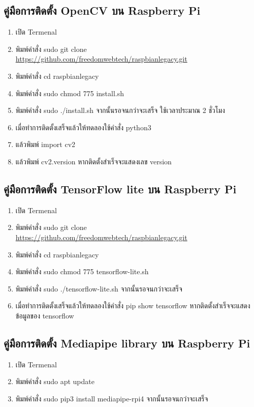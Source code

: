 \subsection{คู่มือการติดตั้ง OpenCV บน Raspberry Pi}
\begin{enumerate}
  \item เปิด Termenal
  \item พิมพ์คำสั่ง sudo git clone \url{https://github.com/freedomwebtech/raspbianlegacy.git}
  \item พิมพ์คำสั่ง cd raspbianlegacy
  \item พิมพ์คำสั่ง sudo chmod 775 install.sh
  \item พิมพ์คำสั่ง sudo ./install.sh จากนั้นรอจนกว่าจะเสร็จ ใช้เวลาประมาณ 2 ชั่วโมง
  \item เมื่อทำการติดตั้งเสร็จแล้วให้ทดลองใช้คำสั่ง python3
  \item แล้วพิมพ์ import cv2
  \item แล้วพิมพ์ cv2.\textunderscore\textunderscore version \textunderscore\textunderscore หากติดตั้งสำเร็จจะแสดงเลข version
\end{enumerate}

\subsection{คู่มือการติดตั้ง TensorFlow lite บน Raspberry Pi}
\begin{enumerate}
  \item เปิด Termenal
  \item พิมพ์คำสั่ง sudo git clone \url{https://github.com/freedomwebtech/raspbianlegacy.git}
  \item พิมพ์คำสั่ง cd raspbianlegacy
  \item พิมพ์คำสั่ง sudo chmod 775 tensorflow-lite.sh
  \item พิมพ์คำสั่ง sudo ./tensorflow-lite.sh จากนั้นรอจนกว่าจะเสร็จ
  \item เมื่อทำการติดตั้งเสร็จแล้วให้ทดลองใช้คำสั่ง pip show tensorflow หากติดตั้งสำเร็จจะแสดงข้อมูลของ tensorflow
\end{enumerate}

\subsection{คู่มือการติดตั้ง Mediapipe library บน Raspberry Pi}
\begin{enumerate}
  \item เปิด Termenal
  \item พิมพ์คำสั่ง sudo apt update
  \item พิมพ์คำสั่ง sudo pip3 install mediapipe-rpi4 จากนั้นรอจนกว่าจะเสร็จ
\end{enumerate}

